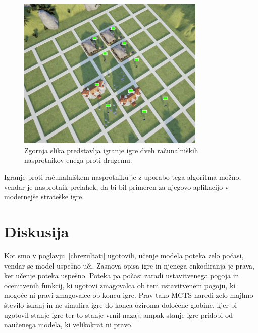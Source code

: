 \documentclass[a4paper, 12pt]{book}
\begin{document}
\begin{figure}[h]
	\begin{center}
		\includegraphics[width=0.8\textwidth]{photos/visualization_ue4.pdf}
	\end{center}
	\caption{Zgornja slika predstavlja igranje igre dveh računalniških nasprotnikov enega proti drugemu.}
	\label{visualization_ue4}
\end{figure}

Igranje proti računalniškem nasprotniku je z uporabo tega algoritma možno, vendar je nasprotnik prelahek, da bi bil primeren za njegovo aplikacijo v modernejše strateške igre.


\chapter{Diskusija}
\label{chdiskusija}

Kot smo v poglavju~\ref{chrezultati} ugotovili, učenje modela poteka zelo počasi, vendar se model uspešno uči.
Zasnova opisa igre in njenega enkodiranja je prava, ker učenje poteka uspešno.
Poteka pa počasi zaradi ustavitvenega pogoja in ocenitvenih funkcij, ki ugotovi zmagovalca ob tem ustavitvenem pogoju, ki mogoče ni pravi zmagovalec ob koncu igre.
Prav tako MCTS naredi zelo majhno število iskanj in ne simulira igre do konca oziroma določene globine, kjer bi ugotovil stanje igre ter to stanje vrnil nazaj, ampak stanje igre pridobi od naučenega modela, ki velikokrat ni pravo.
\end{document}
